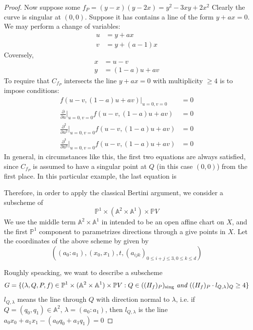 \documentclass[12pt]{article}
\theoremstyle{plain}
\theoremstyle{definition}
\newcommand{\IA}{\mathbb{A}}
\newcommand{\IP}{\mathbb{P}}
\newcommand{\sing}{{\rm sing}}
\newcommand{\<}{\langle}
\renewcommand{\>}{\rangle}
\newcommand{\p}{\partial}
\begin{document}
\begin{proof}
Now suppose some $f_P = (y - x)(y - 2x) = y^2 - 3xy + 2x^2$ Clearly the curve is singular at $(0, 0)$. Suppose it has contains a line of the form $y + ax = 0$. We may perform a change of variables:
\begin{align*}
u &= y + ax \\
v &= y + (a - 1) x
\end{align*}
Coversely,
\begin{align*}
x &= u - v \\
y &= (1 - a)u + av
\end{align*}
To require that $C_{f_P}$ intersects the line $y + ax = 0$ with multiplicity $\ge 4$ is to impose conditions:
\begin{align*}
f (u - v, (1 - a)u + av)|_{u = 0, v= 0}&= 0 \\
\frac{\p }{\p u}\big|_{u=0, v=0}  f (u - v, (1 - a)u + av)&= 0 \\
\frac{\p^2 }{\p u^2}\big|_{u=0, v=0}  f (u - v, (1 - a)u + av)&= 0 \\
\frac{\p^3 }{\p u^3}\big|_{u=0, v=0}  f (u - v, (1 - a)u + av)&= 0
\end{align*}
In general, in circumstances like this, the first two equations are always satisfied, since $C_{f_P}$ is assumed to have a singular point at $Q$ (in this case $(0, 0)$) from the first place. In this particular example, the last equation is 



Therefore, in order to apply the classical Bertini argument, we consider a subscheme of 
$$ \IP^1 \times (\IA^2 \times \IA^1 ) \times \IP V $$
We use the middle term $\IA^2 \times \IA^1$ in intended to be an open affine chart on $X$, and the first $\IP^1$ component to parametrizes directions through a give points in $X$. Let the coordinates of the above scheme by given by 
$$( (a_0 : a_1) , (x_0, x_1), t, (a_{ijk})_{0 \le i + j \le 3, 0 \le k \le d} ) $$ 

Roughly speacking, we want to describe a subscheme 
$$ G = \{ (\lambda, Q, P, f) \in \IP^1 \times (\IA^2 \times \IA^1 ) \times \IP V : Q \in ((H_f)_P)_\sing \textit{ and } ((H_f)_P \cdot l_{Q, \lambda})_Q \ge 4\} $$
$l_{Q, \lambda}$ means the line through $Q$ with direction normal to $\lambda$, i.e. if $Q = (q_0, q_1) \in \IA^2$, $\lambda = (a_0 : a_1)$, then $l_{Q, \lambda}$ is the line $a_0 x_0 + a_1 x_1 - (a_0 q_0 + a_1 q_1) = 0$
\end{proof}
\end{document}
